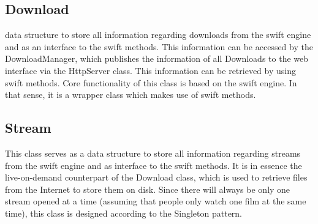 \begin{center}
\begin{figure}[h!]
{}
\label{fig:class_server}
\end{figure}
\end{center}
\clearpage

\subsection{Download}
data structure to store all information regarding downloads from the swift engine and as an interface to the swift methods.
This information can be accessed by the DownloadManager, which publishes the information of all Downloads to the web interface via
the HttpServer class. This information can be retrieved by using swift methods. Core functionality of this class is based on the swift engine.
In that sense, it is a wrapper class which makes use of swift methods.

\subsection{Stream}
This class serves as a data structure to store all information regarding streams from the swift engine and as interface to the swift methods. It 
is in essence the live-on-demand counterpart of the Download class, which is used to retrieve files from the Internet to store them on disk.
Since there will always be only one stream opened at a time (assuming that people only watch one film at the same time),
this class is designed according to the Singleton pattern.

